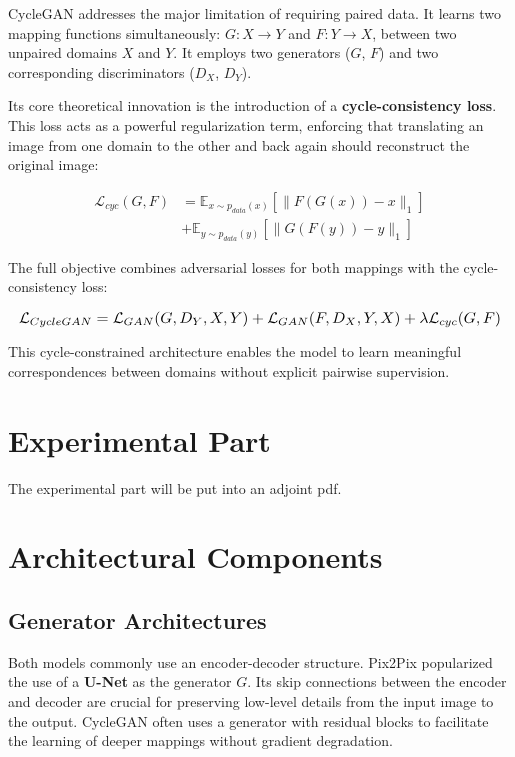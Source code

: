 \documentclass[journal]{IEEEtran}
\begin{document}
 CycleGAN \cite{Zhu2017} addresses the major limitation of requiring
 paired data. It learns two mapping functions simultaneously: $G:
 X \rightarrow Y$ and $F: Y \rightarrow X$, between two unpaired domains
 $X$ and $Y$. It employs two generators ($G$, $F$) and two corresponding
 discriminators ($D_X$, $D_Y$).

 Its core theoretical innovation is the introduction of
 a \textbf{cycle-consistency loss}. This loss acts as a powerful
 regularization term, enforcing that translating an image from one domain
 to the other and back again should reconstruct the original image:

\begin{align}
\mathcal{L}_{cyc}(G, F) &= \mathbb{E}_{x \sim p_{data}(x)}[\|F(G(x)) - x\|_1] \\
&+ \mathbb{E}_{y \sim p_{data}(y)}[\|G(F(y)) - y\|_1]
\end{align}

 The full objective combines adversarial losses for both mappings with the
 cycle-consistency loss:

\begin{equation}
  \resizebox{\columnwidth}{!}{$
    \mathcal{L}_{CycleGAN} = \mathcal{L}_{GAN}(G, D_Y, X, Y) + \mathcal{L}_{GAN}(F, D_X, Y, X) + \lambda \mathcal{L}_{cyc}(G, F)
  $}
\end{equation}
 
 This cycle-constrained architecture enables the model to learn meaningful
 correspondences between domains without explicit pairwise supervision.

\section{Experimental Part}

\begin{center}
\colorbox{red!50}{
  The experimental part will be put into an adjoint pdf.
}
\end{center}

\section{Architectural Components}

\subsection{Generator Architectures}

 Both models commonly use an encoder-decoder structure. Pix2Pix
 popularized the use of a \textbf{U-Net} \cite{Ronneberger2015} as the
 generator $G$. Its skip connections between the encoder and decoder are
 crucial for preserving low-level details from the input image to the
 output. CycleGAN often uses a generator with residual blocks to
 facilitate the learning of deeper mappings without gradient degradation.
\end{document}
